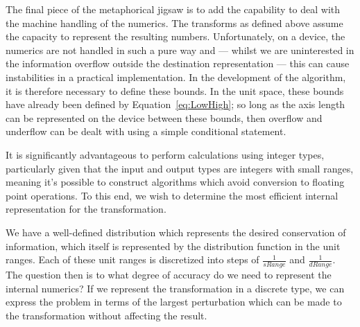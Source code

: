 The final piece of the metaphorical jigsaw is to add the capability to deal with the machine handling of the numerics. The transforms as defined above assume the capacity to represent the resulting numbers. Unfortunately, on a device, the numerics are not handled in such a pure way and --- whilst we are uninterested in the information overflow outside the destination representation --- this can cause instabilities in a practical implementation. In the development of the algorithm, it is therefore necessary to define these bounds. In the unit space, these bounds have already been defined by Equation~\ref{eq:LowHigh}; so long as the axis length can be represented on the device between these bounds, then overflow and underflow can be dealt with using a simple conditional statement. 

It is significantly advantageous to perform calculations using integer types, particularly given that the input and output types are integers with small ranges, meaning it's possible to construct algorithms which avoid conversion to floating point operations. To this end, we wish to determine the most efficient internal representation for the transformation.

We have a well-defined distribution which represents the desired conservation of information, which itself is represented by the distribution function in the unit ranges. Each of these unit ranges is discretized into steps of $\frac{1}{sRange}$ and $\frac{1}{dRange}$. The question then is to what degree of accuracy do we need to represent the internal numerics? If we represent the transformation in a discrete type, we can express the problem in terms of the largest perturbation which can be made to the transformation without affecting the result.

\newcommand{\unitDst}{\text{uDst}}
\newcommand{\uDst}{\unitDst}
\newcommand{\intDst}{\text{iDst}}
\newcommand{\iDst}{\intDst}
\newcommand{\discreteDst}{\widetilde{\uDst}}
\newcommand{\dDst}{\discreteDst}
\newcommand{\delDst}{\delta\uDst}

\newcommand{\unitSrc}{\text{uSrc}}
\newcommand{\uSrc}{\unitSrc}
\newcommand{\intSrc}{\text{iSrc}}
\newcommand{\iSrc}{\intSrc}
\newcommand{\discreteSrc}{\widetilde{\uSrc}}
\newcommand{\dSrc}{\discreteSrc}
\newcommand{\delSrc}{\delta\uSrc}

\newcommand{\unitR}{\text{uR}}
\newcommand{\uR}{\unitR}
\newcommand{\intR}{\text{iR}}
\newcommand{\iR}{\intR}
\newcommand{\discreteR}{\widetilde{\uR}}
\newcommand{\dR}{\discreteR}
\newcommand{\delR}{\delta\uR}

